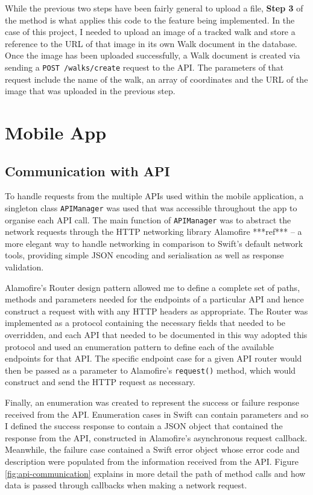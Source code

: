 While the previous two steps have been fairly general to upload a file, \textbf{Step 3} of the method is what applies this code to the feature being implemented. In the case of this project, I needed to upload an image of a tracked walk and store a reference to the URL of that image in its own Walk document in the database. Once the image has been uploaded successfully, a Walk document is created via sending a \texttt{POST /walks/create} request to the API. The parameters of that request include the name of the walk, an array of coordinates and the URL of the image that was uploaded in the previous step.

\section{Mobile App}

\subsection{Communication with API}


To handle requests from the multiple APIs used within the mobile application, a singleton class \texttt{APIManager} was used that was accessible throughout the app to organise each API call. The main function of \texttt{APIManager} was to abstract the network requests through the HTTP networking library Alamofire ***ref*** -- a more elegant way to handle networking in comparison to Swift's default network tools, providing simple JSON encoding and serialisation as well as response validation.

Alamofire's Router design pattern allowed me to define a complete set of paths, methods and parameters needed for the endpoints of a particular API and hence construct a request with with any HTTP headers as appropriate. The Router was implemented as a protocol containing the necessary fields that needed to be overridden, and each API that needed to be documented in this way adopted this protocol and used an enumeration pattern to define each of the available endpoints for that API. The specific endpoint case for a given API router would then be passed as a parameter to Alamofire's \texttt{request()} method, which would construct and send the HTTP request as necessary.

Finally, an enumeration was created to represent the success or failure response received from the API. Enumeration cases in Swift can contain parameters and so I defined the success response to contain a JSON object that contained the response from the API, constructed in Alamofire's asynchronous request callback. Meanwhile, the failure case contained a Swift error object whose error code and description were populated from the information received from the API. Figure \ref{fig:api-communication} explains in more detail the path of method calls and how data is passed through callbacks when making a network request.


